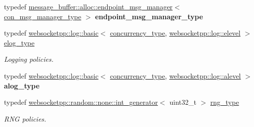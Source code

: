\begin{DoxyCompactItemize}
\item 
\mbox{\label{structwebsocketpp_1_1config_1_1core_ac2a5caeef488e2f177bb8f92a37d2f34}} 
typedef \mbox{\hyperlink{classwebsocketpp_1_1message__buffer_1_1alloc_1_1endpoint__msg__manager}{message\+\_\+buffer\+::alloc\+::endpoint\+\_\+msg\+\_\+manager}}$<$ \mbox{\hyperlink{classwebsocketpp_1_1message__buffer_1_1alloc_1_1con__msg__manager}{con\+\_\+msg\+\_\+manager\+\_\+type}} $>$ {\bfseries endpoint\+\_\+msg\+\_\+manager\+\_\+type}
\item 
\mbox{\label{structwebsocketpp_1_1config_1_1core_ac037ffb73b675a6251f3b86433b4eb17}} 
typedef \mbox{\hyperlink{classwebsocketpp_1_1log_1_1basic}{websocketpp\+::log\+::basic}}$<$ \mbox{\hyperlink{classwebsocketpp_1_1concurrency_1_1basic}{concurrency\+\_\+type}}, \mbox{\hyperlink{structwebsocketpp_1_1log_1_1elevel}{websocketpp\+::log\+::elevel}} $>$ \mbox{\hyperlink{structwebsocketpp_1_1config_1_1core_ac037ffb73b675a6251f3b86433b4eb17}{elog\+\_\+type}}
\begin{DoxyCompactList}\small\item\em Logging policies. \end{DoxyCompactList}\item 
\mbox{\label{structwebsocketpp_1_1config_1_1core_a3b2c116aa4077f10b085f008b48028e2}} 
typedef \mbox{\hyperlink{classwebsocketpp_1_1log_1_1basic}{websocketpp\+::log\+::basic}}$<$ \mbox{\hyperlink{classwebsocketpp_1_1concurrency_1_1basic}{concurrency\+\_\+type}}, \mbox{\hyperlink{structwebsocketpp_1_1log_1_1alevel}{websocketpp\+::log\+::alevel}} $>$ {\bfseries alog\+\_\+type}
\item 
\mbox{\label{structwebsocketpp_1_1config_1_1core_a245db33d05f7994d221db66f506ab8c6}} 
typedef \mbox{\hyperlink{classwebsocketpp_1_1random_1_1none_1_1int__generator}{websocketpp\+::random\+::none\+::int\+\_\+generator}}$<$ uint32\+\_\+t $>$ \mbox{\hyperlink{structwebsocketpp_1_1config_1_1core_a245db33d05f7994d221db66f506ab8c6}{rng\+\_\+type}}
\begin{DoxyCompactList}\small\item\em R\+NG policies. \end{DoxyCompactList}\item 
\mbox{\label{structwebsocketpp_1_1config_1_1core_a378afa38a0e66a4d9a1a865ad1b2d13d}} 

\end{DoxyCompactItemize}
